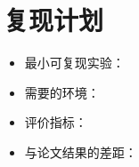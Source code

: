 \section{复现计划}

\begin{itemize}
  \item 最小可复现实验：
  \item 需要的环境：
  \item 评价指标：
  \item 与论文结果的差距：
\end{itemize}
